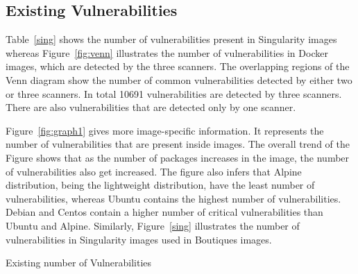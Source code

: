 \documentclass[a4paper,num-refs]{oup-contemporary}
\begin{document}
\subsection{Existing Vulnerabilities}

Table~\ref{sing} shows the number of vulnerabilities present in Singularity images whereas 
Figure~\ref{fig:venn} illustrates the number of vulnerabilities in Docker images, which are detected by the three scanners. The
overlapping regions of the Venn diagram show the number of common vulnerabilities detected by either two or
three scanners. In total 10691 vulnerabilities are detected by three scanners.
There are also vulnerabilities that are detected only by one scanner.

Figure~\ref{fig:graph1} gives more image-specific information.
It represents the number of vulnerabilities that are present inside images.
The overall trend of the Figure shows that as the number of packages increases in the image, the number of vulnerabilities
also get increased.
The figure also infers that Alpine distribution, being the
lightweight distribution, have the least number of vulnerabilities, whereas Ubuntu contains the highest number of
vulnerabilities. Debian and Centos contain a higher number of critical vulnerabilities than Ubuntu and Alpine.
Similarly, Figure~\ref{sing} illustrates the number of vulnerabilities in Singularity images used in Boutiques images.
\begin{table}
%
       \centering
	\caption{\label{table1}Existing number of Vulnerabilities}
\end{table}
\end{document}
